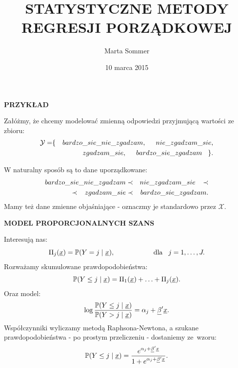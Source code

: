 \documentclass[11pt,usenames,dvipsnames,svgnames,x11names]{beamer}
\title{STATYSTYCZNE METODY \newline REGRESJI PORZĄDKOWEJ}
\author{Marta Sommer}
\institute{MiNI, Politechnika Warszawska}
\date{10 marca 2015}
\theoremstyle{plain}
\theoremstyle{definition}
\theoremstyle{remark}
\begin{document}
\begin{frame}
	\titlepage
\end{frame}


\begin{frame}
\Huge
\centering
\textbf{PRZYKŁAD}
\end{frame}

\begin{frame}
Załóżmy, że chcemy modelować zmienną odpowiedzi przyjmującą wartości ze zbioru: 
\begin{eqnarray*}
\mathcal{Y}=&\lbrace&\hspace{0mm}bardzo\_sie\_nie\_zgadzam,\hspace{5mm}nie\_zgadzam\_sie,\\ && zgadzam\_sie,\hspace{5mm}bardzo\_sie\_zgadzam\hspace{3mm} \rbrace.
\end{eqnarray*}

W naturalny sposób są to dane uporządkowane:
\begin{eqnarray*}
bardzo\_sie\_nie\_zgadzam &\prec& nie\_zgadzam\_sie\hspace{3mm}\prec \\
\prec\hspace{3mm}zgadzam\_sie &\prec& bardzo\_sie\_zgadzam.
\end{eqnarray*} 
Mamy też dane zmienne objaśniające - oznaczmy je standardowo przez $\mathcal{X}$.  
\end{frame}

\begin{frame}
\Huge
\centering
\textbf{MODEL PROPORCJONALNYCH SZANS}
\end{frame}

\begin{frame}
Interesują nas:
$$
\Pi_j(\underline{x})=\mathbb{P}(Y=j\hspace{1mm}|\hspace{1mm}\underline{x}),\hspace{2cm} \textrm{dla}\hspace{3mm} j=1,\ldots,J.
$$
Rozważamy skumulowane prawdopodobieństwa:
$$
\mathbb{P}(Y\leq j \hspace{1mm}|\hspace{1mm} \underline{x})=\Pi_1(\underline{x})+\ldots+\Pi_j(\underline{x}).
$$
Oraz model:
$$
\log\dfrac{\mathbb{P}(Y\leq j \hspace{1mm}|\hspace{1mm} \underline{x})}{\mathbb{P}(Y> j \hspace{1mm}|\hspace{1mm} \underline{x})} = \alpha_j+\underline{\beta}'\underline{x}.
$$
Współczynniki wyliczamy metodą Raphsona-Newtona, a szukane prawdopodobieństwa - po prostym przeliczeniu - dostaniemy ze~wzoru:
$$
\mathbb{P}(Y\leq j \hspace{1mm}|\hspace{1mm} \underline{x})=\dfrac{e^{\alpha_j+\underline{\beta}'\underline{x}}}{1+e^{\alpha_j+\underline{\beta}'\underline{x}}}.
$$ 
\end{frame}
\end{document}
